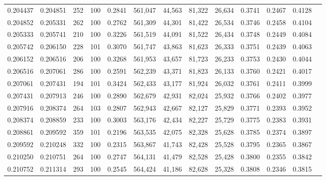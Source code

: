 \begin{tabular}{rrrrrrrrrrrrr}
0.204437 & 0.204851 &   252 & 100 &                                     0.2841 & 561,047 &  44,563 &  81,322 &  26,634 & 0.3741 & 0.2467 & 0.4128 \\
0.204852 & 0.205331 &   262 & 100 &                                     0.2762 & 561,309 &  44,301 &  81,422 &  26,534 & 0.3746 & 0.2458 & 0.4104 \\
0.205333 & 0.205741 &   210 & 100 &                                     0.3226 & 561,519 &  44,091 &  81,522 &  26,434 & 0.3748 & 0.2449 & 0.4084 \\
0.205742 & 0.206150 &   228 & 101 &                                     0.3070 & 561,747 &  43,863 &  81,623 &  26,333 & 0.3751 & 0.2439 & 0.4063 \\
0.206152 & 0.206516 &   206 & 100 &                                     0.3268 & 561,953 &  43,657 &  81,723 &  26,233 & 0.3753 & 0.2430 & 0.4044 \\
0.206516 & 0.207061 &   286 & 100 &                                     0.2591 & 562,239 &  43,371 &  81,823 &  26,133 & 0.3760 & 0.2421 & 0.4017 \\
0.207061 & 0.207431 &   194 & 101 &                                     0.3424 & 562,433 &  43,177 &  81,924 &  26,032 & 0.3761 & 0.2411 & 0.3999 \\
0.207431 & 0.207913 &   246 & 100 &                                     0.2890 & 562,679 &  42,931 &  82,024 &  25,932 & 0.3766 & 0.2402 & 0.3977 \\
0.207916 & 0.208374 &   264 & 103 &                                     0.2807 & 562,943 &  42,667 &  82,127 &  25,829 & 0.3771 & 0.2393 & 0.3952 \\
0.208374 & 0.208859 &   233 & 100 &                                     0.3003 & 563,176 &  42,434 &  82,227 &  25,729 & 0.3775 & 0.2383 & 0.3931 \\
0.208861 & 0.209592 &   359 & 101 &                                     0.2196 & 563,535 &  42,075 &  82,328 &  25,628 & 0.3785 & 0.2374 & 0.3897 \\
0.209592 & 0.210248 &   332 & 100 &                                     0.2315 & 563,867 &  41,743 &  82,428 &  25,528 & 0.3795 & 0.2365 & 0.3867 \\
0.210250 & 0.210751 &   264 & 100 &                                     0.2747 & 564,131 &  41,479 &  82,528 &  25,428 & 0.3800 & 0.2355 & 0.3842 \\
0.210752 & 0.211314 &   293 & 100 &                                     0.2545 & 564,424 &  41,186 &  82,628 &  25,328 & 0.3808 & 0.2346 & 0.3815 \\

\end{tabular}
